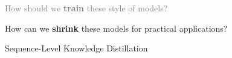 \documentclass{beamer}
\let\tempone\itemize
\let\temptwo\enditemize
\renewenvironment{itemize}{\tempone\addtolength{\itemsep}{0.5\baselineskip}}{\temptwo}
\newcommand{\air}{\vspace{0.25cm}}
\newcommand{\Cite}[1]{{\footnotesize \citep{#1}}}
\begin{document}



\begin{frame}
  \centerline{}
  \air 
  \air

  \begin{itemize}
  \item  \textcolor{gray}{ How should we \textbf{train} these style of models? \Cite{Wiseman2016a}}
    \air 
  \item How can we \textbf{shrink} these models for practical applications?

    \air 
    \begin{center}
      \alert{Sequence-Level Knowledge Distillation }

      \Cite{Kim2016a} 
    \end{center}

  \end{itemize}
\end{frame}



\end{document}
